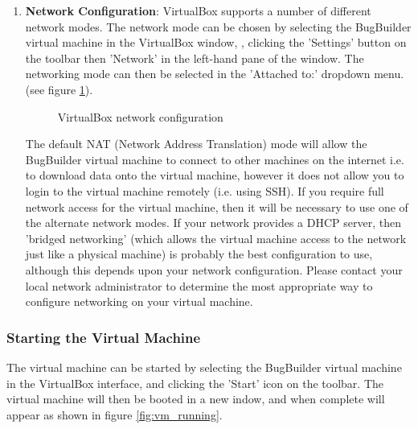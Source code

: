 \documentclass[a4paper,10pt]{article}
\begin{document}
\begin{enumerate}
\item \textbf{Network Configuration}: VirtualBox supports a number of different
network modes.  The network mode can be chosen by selecting the BugBuilder
virtual machine in the VirtualBox window, , clicking the 'Settings' button on
the toolbar then 'Network' in the left-hand pane of the window. The networking
mode can then be selected in the 'Attached to:' dropdown menu. (see figure
\ref{fig:vm_network_settings}).

\begin{figure}[H] 
\caption{VirtualBox network configuration} \label{fig:vm_network_settings} \end{figure}

The default NAT (Network Address Translation) mode will allow
the BugBuilder virtual machine to connect to other machines on the internet
i.e. to download data onto the virtual machine, however it does not allow you
to login to the virtual machine remotely (i.e. using SSH).  If you require full
network access for the virtual machine, then it will be necessary to use one of
the alternate network modes. If your network provides a DHCP server, then
'bridged networking' (which allows the virtual machine access to the network
just like a physical machine) is probably the best configuration to use,
although this depends upon your network configuration. Please contact your
local network administrator to determine the most appropriate way to configure
networking on your virtual machine.

\end{enumerate}

\subsubsection{Starting the Virtual Machine}

The virtual machine can be started by selecting the BugBuilder virtual machine
in the VirtualBox interface, and clicking the 'Start' icon on the toolbar.  The
virtual machine will then be booted in a new indow, and when complete will
appear as shown in figure \ref{fig:vm_running}.
\end{document}
